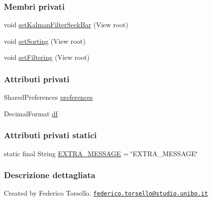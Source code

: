 \subsubsection*{Membri privati}
\begin{DoxyCompactItemize}
\item 
void \hyperlink{classit_1_1unibo_1_1torsello_1_1bluetoothpositioning_1_1fragment_1_1SettingsFragment_a84057f1633708ec85de5968ed9e7f032_a84057f1633708ec85de5968ed9e7f032}{set\+Kalman\+Filter\+Seek\+Bar} (View root)
\item 
void \hyperlink{classit_1_1unibo_1_1torsello_1_1bluetoothpositioning_1_1fragment_1_1SettingsFragment_ae29f0b3d6fc60f1ceeab5dcc530166c1_ae29f0b3d6fc60f1ceeab5dcc530166c1}{set\+Sorting} (View root)
\item 
void \hyperlink{classit_1_1unibo_1_1torsello_1_1bluetoothpositioning_1_1fragment_1_1SettingsFragment_a0d7b911602439aaf2a9ee4d5f9e41088_a0d7b911602439aaf2a9ee4d5f9e41088}{set\+Filtering} (View root)
\end{DoxyCompactItemize}
\subsubsection*{Attributi privati}
\begin{DoxyCompactItemize}
\item 
Shared\+Preferences \hyperlink{classit_1_1unibo_1_1torsello_1_1bluetoothpositioning_1_1fragment_1_1SettingsFragment_a52480c4d5d81ca59fe4a98ae3c623ea4_a52480c4d5d81ca59fe4a98ae3c623ea4}{preferences}
\item 
Decimal\+Format \hyperlink{classit_1_1unibo_1_1torsello_1_1bluetoothpositioning_1_1fragment_1_1SettingsFragment_af6b80a700dc80c39a56d001b68a47694_af6b80a700dc80c39a56d001b68a47694}{df}
\end{DoxyCompactItemize}
\subsubsection*{Attributi privati statici}
\begin{DoxyCompactItemize}
\item 
static final String \hyperlink{classit_1_1unibo_1_1torsello_1_1bluetoothpositioning_1_1fragment_1_1SettingsFragment_a3f3c627008cd1e176afc52642c73fd93_a3f3c627008cd1e176afc52642c73fd93}{E\+X\+T\+R\+A\+\_\+\+M\+E\+S\+S\+A\+GE} = \char`\"{}E\+X\+T\+R\+A\+\_\+\+M\+E\+S\+S\+A\+GE\char`\"{}
\end{DoxyCompactItemize}


\subsubsection{Descrizione dettagliata}
Created by Federico Torsello. \href{mailto:federico.torsello@studio.unibo.it}{\tt federico.\+torsello@studio.\+unibo.\+it} 

